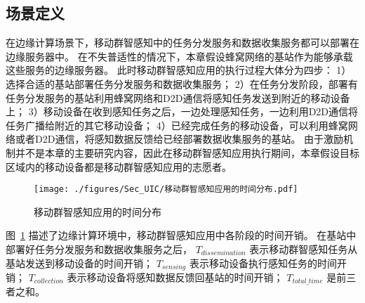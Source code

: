 \subsection{场景定义}
\label{UIC:Scenario}


在边缘计算场景下，移动群智感知中的任务分发服务和数据收集服务都可以部署在边缘服务器中。
在不失普适性的情况下，本章假设蜂窝网络的基站作为能够承载这些服务的边缘服务器。
此时移动群智感知应用的执行过程大体分为四步：
1）选择合适的基站部署任务分发服务和数据收集服务；
2）在任务分发阶段，部署有任务分发服务的基站利用蜂窝网络和D2D通信将感知任务发送到附近的移动设备上；
3）移动设备在收到感知任务之后，一边处理感知任务，一边利用D2D通信将任务广播给附近的其它移动设备；
4）已经完成任务的移动设备，可以利用蜂窝网络或者D2D通信，将感知数据反馈给已经部署数据收集服务的基站。
由于激励机制并不是本章的主要研究内容，因此在移动群智感知应用执行期间，本章假设目标区域内的移动设备都是移动群智感知应用的志愿者。

\begin{figure}[!h]
  \centering
  \vspace{-1em}
  \texttt{[image: ./figures/Sec\_UIC/移动群智感知应用的时间分布.pdf]}
  \vspace{-0.5em}
  \caption{移动群智感知应用的时间分布}
  \vspace{-1em}
  \label{Figure_MCS_Delay}
\end{figure}

图~\ref{Figure_MCS_Delay} 描述了边缘计算环境中，移动群智感知应用中各阶段的时间开销。
在基站中部署好任务分发服务和数据收集服务之后，
$T_{dissemination}$ 表示移动群智感知任务从基站发送到移动设备的时间开销；
$T_{sensing}$ 表示移动设备执行感知任务的时间开销；
$T_{collection}$ 表示移动设备将感知数据反馈回基站的时间开销；
$T_{total\_time}$ 是前三者之和。


